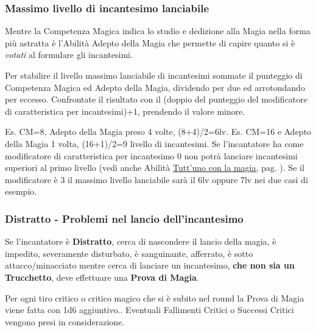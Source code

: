 \begin{multicols}{2}

\subsubsection{Massimo livello di incantesimo lanciabile}\hypertarget{scuoleelivelli}{}\label{magieaccessoallelistedimagia}\label{scuoleelivelli}

Mentre la Competenza Magica indica lo studio e dedizione alla Magia nella forma più astratta è l'Abilità Adepto della Magia che permette di capire quanto si è \emph{votati} al formulare gli incantesimi.

Per stabilire il livello massimo lanciabile di incantesimi sommate il punteggio di Competenza Magica ed Adepto della Magia, dividendo per due ed arrotondando per eccesso. Confrontate il risultato con il (doppio del punteggio del modificatore di caratteristica per incantesimi)+1, prendendo il valore minore.

Es. CM=8, Adepto della Magia preso 4 volte, (8+4)/2=6lv. Es. CM=16 e Adepto della Magia 1 volta, (16+1)/2=9 livello di incantesimi.
Se l'incantatore ha come modificatore di caratteristica per incantesimo 0 non potrà lanciare incantesimi superiori al primo livello (vedi anche Abilità \hyperlink{Tutt'uno con la magia}{Tutt'uno con la magia}, pag. \pageref{Tutt'uno con la magia}).
Se il modificatore è 3 il massimo livello lanciabile sarà il 6lv oppure 7lv nei due casi di esempio.

\subsubsection{Distratto - Problemi nel lancio dell'incantesimo}\label{magiedistratto}

Se l'incantatore è \textbf{Distratto}, cerca di nascondere il lancio della magia, è impedito, severamente disturbato, è sanguinante, afferrato, è sotto attacco/minacciato mentre cerca di lanciare un incantesimo, \textbf{che non sia un Trucchetto}, deve effettuare una \textbf{Prova di Magia}.

Per ogni tiro critico o critico magico che si è subito nel round la Prova di Magia viene fatta con 1d6 aggiuntivo.. Eventuali Fallimenti Critici o Successi Critici vengono presi in considerazione.


\end{multicols}
